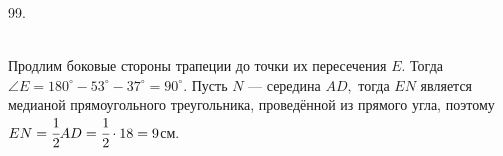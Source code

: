 99. \begin{figure}[ht!]
\end{figure}\\
Продлим боковые стороны трапеции до точки их пересечения $E.$ Тогда $\angle E=180^\circ-53^\circ-37^\circ=90^\circ.$ Пусть $N$ --- середина $AD,$ тогда $EN$ является медианой прямоугольного треугольника, проведённой из прямого угла, поэтому $EN=\cfrac{1}{2}AD=\cfrac{1}{2}\cdot18=9$см.\\
